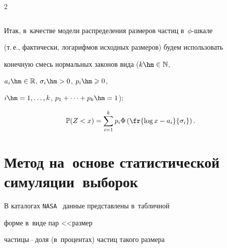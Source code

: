 \begin{multicols}{2}
\begin{table}[b]
\begin{center}
\begin{tabular}{l}
\hline


\end{tabular}










\end{center}


\end{table}








\renewcommand{\tablename}{\protect\bf Таблица}





Итак, в~качестве модели распределения размеров частиц в~$\phi$-шка\-ле 


(т.\,е., фактически, логарифмов исходных размеров) будем использовать 


конечную смесь нормальных законов вида ($k\hm\in\mathbb{N}$, 


$a_i\hm\in\mathbb{R}$, $\sigma_i\hm>0$, $p_i\hm\geqslant 0$,


$i\hm=1,\ldots,k$, $p_1+\cdots+p_k\hm=1$):


\begin{equation}


\label{LogPhi}


{\mathbb P}(Z<x)=\sum\limits_{i=1}^k p_i\Phi\left(\fr{\log


x-a_i}{\sigma_i}\right).


\end{equation}








\section{Метод на~основе статистической симуляции~выборок}





В каталогах \verb"NASA"~\cite{Graf1993} данные представлены в~таб\-лич\-ной 


форме в~виде пар <<размер  


час\-ти\-цы\,--\,до\-ля (в~процентах) частиц такого размера 



\end{multicols}
